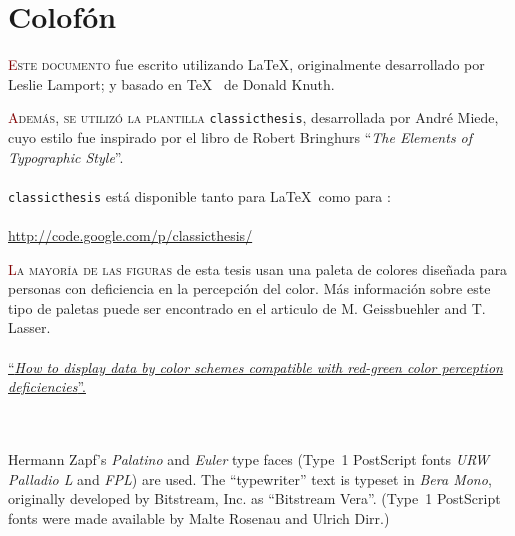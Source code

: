 \pagestyle{empty}
\hfill \vfill

\section*{\hspace*{-40pt}Colofón}
\bigskip

\hspace*{120pt}
\parbox{230pt}{\lettrine[lines=3]{\textcolor{Maroon}{E}}{ste documento} fue escrito utilizando \LaTeX, originalmente desarrollado por Leslie Lamport; y basado en \TeX~ de Donald Knuth.}

\vspace{20pt}
\hspace*{30pt}
\parbox{320pt}{\lettrine[lines=3, slope=1pt]{\textcolor{Maroon}{A}}{demás, se utilizó la plantilla}
\texttt{classicthesis}, desarrollada por Andr\'e Miede, cuyo estilo fue inspirado por el libro de Robert Bringhurs ``\emph{The Elements of Typographic Style}''.
\\~\\
\texttt{classicthesis} está disponible tanto para \LaTeX\ como para \mLyX: \\~\\
\url{http://code.google.com/p/classicthesis/}
}

\vspace{20pt} \hspace{-60pt}
\parbox{410pt}{\lettrine[lines=3]{\textcolor{Maroon}{L}}{a mayoría de las figuras} de esta tesis usan una paleta de colores diseñada para personas con deficiencia en la percepción del color. Más información sobre este tipo de paletas puede ser encontrado en el articulo de M. Geissbuehler and T. Lasser.
\\~\\
\href{http://lob.epfl.ch/page-89396-en.html}{
``\emph{How to display data by color schemes compatible with red-green color perception deficiencies}''.}
}

\bigskip

\noindent\finalVersionString \\~\\
Hermann Zapf's \emph{Palatino} and \emph{Euler} type faces (Type~1 PostScript fonts \emph{URW Palladio L} and \emph{FPL}) are used. The ``typewriter'' text is typeset in \emph{Bera Mono}, originally developed by Bitstream, Inc. as ``Bitstream Vera''. (Type~1 PostScript fonts were made available by Malte Rosenau and Ulrich Dirr.)

